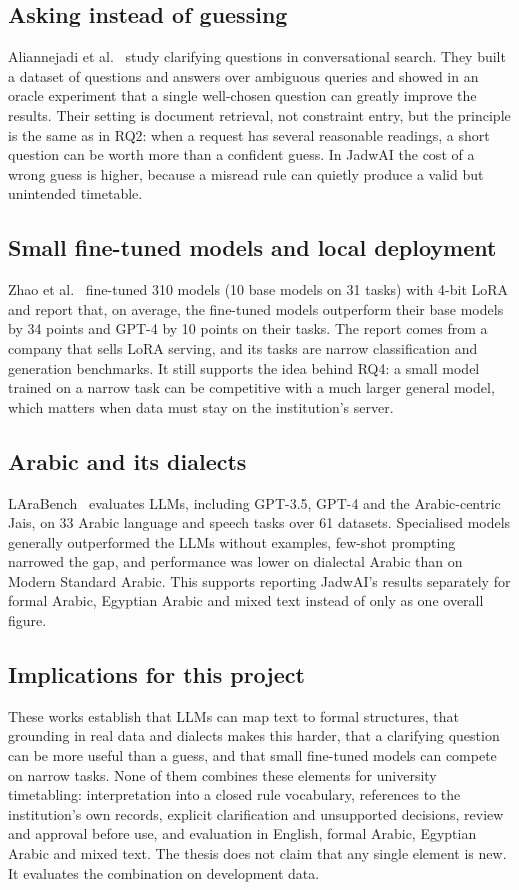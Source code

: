 \subsection{Asking instead of guessing}
Aliannejadi et al.~\cite{aliannejadi2019clarifying} study clarifying questions in conversational search. They built a dataset of questions and answers over ambiguous queries and showed in an oracle experiment that a single well-chosen question can greatly improve the results. Their setting is document retrieval, not constraint entry, but the principle is the same as in RQ2: when a request has several reasonable readings, a short question can be worth more than a confident guess. In JadwAI the cost of a wrong guess is higher, because a misread rule can quietly produce a valid but unintended timetable.

\subsection{Small fine-tuned models and local deployment}
Zhao et al.~\cite{zhao2024loraland} fine-tuned 310 models (10 base models on 31 tasks) with 4-bit LoRA and report that, on average, the fine-tuned models outperform their base models by 34 points and GPT-4 by 10 points on their tasks. The report comes from a company that sells LoRA serving, and its tasks are narrow classification and generation benchmarks. It still supports the idea behind RQ4: a small model trained on a narrow task can be competitive with a much larger general model, which matters when data must stay on the institution's server.

\subsection{Arabic and its dialects}
LAraBench~\cite{abdelali2024larabench} evaluates LLMs, including GPT-3.5, GPT-4 and the Arabic-centric Jais, on 33 Arabic language and speech tasks over 61 datasets. Specialised models generally outperformed the LLMs without examples, few-shot prompting narrowed the gap, and performance was lower on dialectal Arabic than on Modern Standard Arabic. This supports reporting JadwAI's results separately for formal Arabic, Egyptian Arabic and mixed text instead of only as one overall figure.

\subsection{Implications for this project}
These works establish that LLMs can map text to formal structures, that grounding in real data and dialects makes this harder, that a clarifying question can be more useful than a guess, and that small fine-tuned models can compete on narrow tasks. None of them combines these elements for university timetabling: interpretation into a closed rule vocabulary, references to the institution's own records, explicit clarification and unsupported decisions, review and approval before use, and evaluation in English, formal Arabic, Egyptian Arabic and mixed text. The thesis does not claim that any single element is new. It evaluates the combination on development data.

